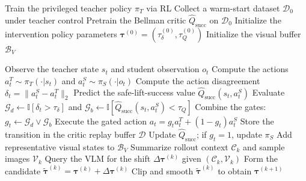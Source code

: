 \begin{algorithm}[t]
\footnotesize
\caption{\methodname}
\label{alg:safe_dagger}
\begin{algorithmic}[1]

\STATE Train the privileged teacher policy $\pi_T$ via RL
\STATE Collect a warm-start dataset $\mathcal{D}_0$ under teacher control
\STATE Pretrain the Bellman critic $\hat Q_{\mathrm{succ}}$ on $\mathcal{D}_0$
\STATE Initialize the intervention policy parameters
{\footnotesize $\boldsymbol{\tau}^{(0)}=(\tau_\delta^{(0)},\tau_Q^{(0)})$}
\STATE Initialize the visual buffer $\mathcal{B}_V$

    \STATE Observe the teacher state $s_t$ and student observation $o_t$
    \STATE Compute the actions $a_t^T\sim\pi_T(\cdot|s_t)$ and $a_t^S\sim\pi_S(\cdot|o_t)$
    \STATE Compute the action disagreement $\delta_t=\|a_t^S-a_t^T\|_2$
    \STATE Predict the safe-lift-success value $\hat Q_{\mathrm{succ}}(s_t,a_t^S)$
    \STATE Evaluate $\mathcal{G}_d\gets\mathbb{I}[\delta_t>\tau_\delta]$
    and $\mathcal{G}_b\gets\mathbb{I}[\hat Q_{\mathrm{succ}}(s_t,a_t^S)<\tau_Q]$
    \STATE Combine the gates: $g_t\gets\mathcal{G}_d\lor\mathcal{G}_b$
    \STATE Execute the gated action $a_t=g_t a_t^T+(1-g_t)a_t^S$
    \STATE Store the transition in the critic replay buffer $\mathcal{D}$
    \STATE Update $\hat Q_{\mathrm{succ}}$; if $g_t=1$, update $\pi_S$
    \STATE Add representative visual states to $\mathcal{B}_V$
        \STATE Summarize rollout context $\mathcal{C}_k$ and sample images $\mathcal{V}_k$
        \STATE Query the VLM for the shift $\Delta\boldsymbol{\tau}^{(k)}$ given $(\mathcal{C}_k,\mathcal{V}_k)$
        \STATE Form the candidate $\tilde{\boldsymbol{\tau}}^{(k)}=\boldsymbol{\tau}^{(k)}+\Delta\boldsymbol{\tau}^{(k)}$
        \STATE Clip and smooth $\tilde{\boldsymbol{\tau}}^{(k)}$ to obtain $\boldsymbol{\tau}^{(k+1)}$
    \ENDIF
\ENDFOR

\end{algorithmic}
\end{algorithm}
